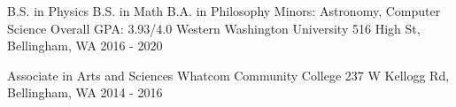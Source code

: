 

\begin{cventries}

 \cventry
    {B.S. in Physics \newline
    B.S.  in Math    \newline
     B.A. in Philosophy \newline 
     Minors: Astronomy, Computer Science \newline
     Overall GPA: 3.93/4.0}
    {Western Washington University} %
    {516 High St, Bellingham, WA} %
    {2016 - 2020} %
    {}{}
    

 \cventry
    {Associate in Arts and Sciences } %
    {Whatcom Community College} %
    {237 W Kellogg Rd, Bellingham, WA} %
    {2014 - 2016} %
    {}{}

\vspace{-0.3cm}
\end{cventries}
